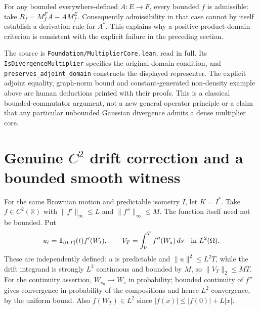 \documentclass[11pt]{article}
\newcommand{\ind}{\mathbf1}
\newcommand{\code}[1]{{\small\nolinkurl{#1}}}
\newcommand{\R}{\mathbb R}
\begin{document}
For any bounded everywhere-defined $A:E\to F$, every bounded $f$ is
admissible: take $R_f=M_f^FA-AM_f^E$. Consequently admissibility in
that case cannot by itself establish a derivation rule for $A^*$.
This explains why a positive product-domain criterion is consistent
with the explicit failure in the preceding section.

\par\noindent
The source is \code{Foundation/MultiplierCore.lean}, read in full.
Its \code{IsDivergenceMultiplier} specifies the original-domain
condition, and \code{preserves_adjoint_domain} constructs the displayed
representer. The explicit adjoint equality, graph-norm bound and
constant-generated non-density example above are human deductions
printed with their proofs. This is a classical bounded-commutator
argument, not a new general operator principle or a claim that any
particular unbounded Gaussian divergence admits a dense multiplier core.

\section{Genuine $C^2$ drift correction and a bounded smooth witness}
For the same Brownian motion and predictable isometry $I$, let $K=I^*$.
Take $f\in C^2(\R)$ with $\|f'\|_\infty\leq L$ and
$\|f''\|_\infty\leq M$. The function itself need not be bounded.
Put
\[
 u_t=\ind_{(0,T]}(t)f'(W_t),\qquad
 V_T=\int_0^T f''(W_s)\,ds\quad\hbox{in }L^2(\Omega).
\]
These are independently defined: $u$ is predictable and
$\|u\|^2\leq L^2T$, while the drift integrand is strongly
$L^2$ continuous and bounded by $M$, so $\|V_T\|_2\leq MT$.
For the continuity assertion, $W_{s_n}\to W_s$ in probability;
bounded continuity of $f''$ gives convergence in probability of the
compositions and hence $L^2$ convergence, by the uniform bound.
Also $f(W_T)\in L^2$ since $|f(x)|\leq |f(0)|+L|x|$.
\end{document}
